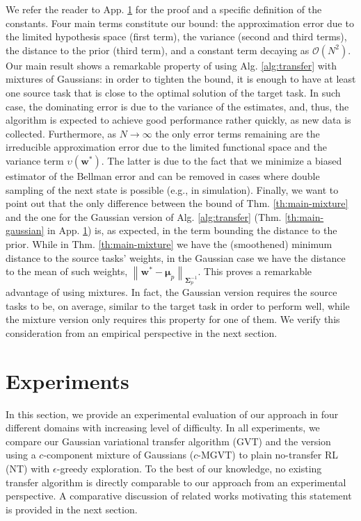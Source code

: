 \documentclass{article}
\newcommand{\norm}[1]{\left\lVert #1 \right\rVert}
\begin{document}
We refer the reader to App. \ref{} for the proof and a specific definition of the constants. Four main terms constitute our bound: the approximation error due to the limited hypothesis space (first term), the variance (second and third terms), the distance to the prior (third term), and a constant term decaying as $\mathcal{O}(N^2)$. Our main result shows a remarkable property of using Alg. \ref{alg:transfer} with mixtures of Gaussians: in order to tighten the bound, it is enough to have at least one source task that is close to the optimal solution of the target task. In such case, the dominating error is due to the variance of the estimates, and, thus, the algorithm is expected to achieve good performance rather quickly, as new data is collected. Furthermore, as $N\rightarrow\infty$ the only error terms remaining are the irreducible approximation error due to the limited functional space and the  variance term $\upsilon(\bm{w}^*)$. The latter is due to the fact that we minimize a biased estimator of the Bellman error and can be removed in cases where double sampling of the next state is possible (e.g., in simulation). Finally, we want to point out that the only difference between the bound of Thm. \ref{th:main-mixture} and the one for the Gaussian version of Alg. \ref{alg:transfer} (Thm. \ref{th:main-gaussian} in App. \ref{}) is, as expected, in the term bounding the distance to the prior. While in Thm. \ref{th:main-mixture} we have the (smoothened) minimum distance to the source tasks' weights, in the Gaussian case we have the distance to the mean of such weights, $\norm{\bm{w}^* - \bm{\mu}_p}_{\bm{\Sigma}_p^{-1}}$. This proves a remarkable advantage of using mixtures. In fact, the Gaussian version requires the source tasks to be, on average, similar to the target task in order to perform well, while the mixture version only requires this property for one of them. We verify this consideration from an empirical perspective in the next section.

\section{Experiments}

In this section, we provide an experimental evaluation of our approach in four different domains with increasing level of difficulty. In all experiments, we compare our Gaussian variational transfer algorithm (GVT) and the version using a $c$-component mixture of Gaussians ($c$-MGVT) to plain no-transfer RL (NT) with $\epsilon$-greedy exploration. To the best of our knowledge, no existing transfer algorithm is directly comparable to our approach from an experimental perspective. A comparative discussion of related works motivating this statement is provided in the next section.
\end{document}
